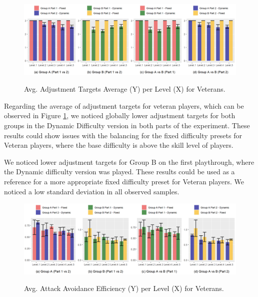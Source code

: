 \begin{figure}[!ht]
    \begin{center}
    \caption{Avg. Adjustment Targets Average (Y) per Level (X) for Veterans.}
        \includegraphics[width=\textwidth]{figures/adjustment_target_level-veteran_players.png}
    \label{fig:result-metric-veteran-adjustment-target-level}
    \end{center}
\end{figure}

Regarding the average of adjustment targets for veteran players, which can be observed in Figure \ref{fig:result-metric-veteran-adjustment-target-level}, we noticed globally lower adjustment targets for both groups in the Dynamic Difficulty version in both parts of the experiment. These results could show issues with the balancing for the fixed difficulty presets for Veteran players, where the base difficulty is above the skill level of players.

We noticed lower adjustment targets for Group B on the first playthrough, where the Dynamic difficulty version was played. These results could be used as a reference for a more appropriate fixed difficulty preset for Veteran players. We noticed a low standard deviation in all observed samples.

\begin{figure}[!ht]
    \begin{center}
        \caption{Avg. Attack Avoidance Efficiency (Y) per Level (X) for Veterans.}
        \includegraphics[width=\textwidth]{figures/attack_avoidance_efficiency-veteran_players.png}
    \label{fig:result-metric-veterans-attack-avoidance-efficiency}
    \end{center}
\end{figure}

